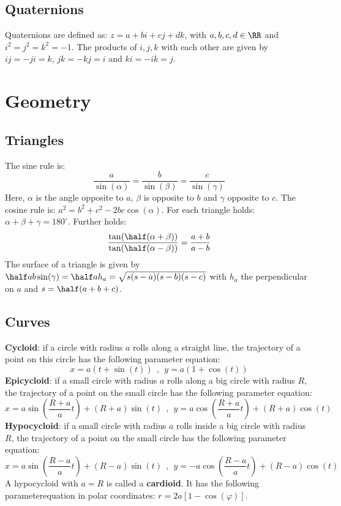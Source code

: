\subsection{Quaternions}
Quaternions are defined as: $z=a+bi+cj+dk$, with $a,b,c,d\in\RR$ and
$i^2=j^2=k^2=-1$. The products of $i,j,k$ with each other are given by
$ij=-ji=k$, $jk=-kj=i$ and $ki=-ik=j$.

\section{Geometry}
\subsection{Triangles}
The sine rule is:
\[
\frac{a}{\sin(\alpha)}=\frac{b}{\sin(\beta)}=\frac{c}{\sin(\gamma)}
\]
Here, $\alpha$ is the angle opposite to $a$, $\beta$ is opposite to $b$ and
$\gamma$ opposite to $c$. The cosine rule is: $a^2=b^2+c^2-2bc\cos(\alpha)$.
For each triangle holds: $\alpha+\beta+\gamma=180^\circ$.
\npar
Further holds:
\[
\frac{\tan(\half(\alpha+\beta))}{\tan(\half(\alpha-\beta))}=\frac{a+b}{a-b}
\]
The surface of a triangle is given by $\half ab\sin(\gamma)=\half ah_a=\sqrt{s(s-a)(s-b)(s-c)}$
with $h_a$ the perpendicular on $a$ and $s=\half(a+b+c)$.

\subsection{Curves}
{\bf Cycloid}: if a circle with radius $a$ rolls along a straight line, the
trajectory of a point on this circle has the following parameter equation:
\[
x=a(t+\sin(t))~~,~~y=a(1+\cos(t))
\]
{\bf Epicycloid}: if a small circle with radius $a$ rolls along a big circle
with radius $R$, the trajectory of a point on the small circle has the
following parameter equation:
\[
x=a\sin\left(\frac{R+a}{a}t\right)+(R+a)\sin(t)~~,~~
y=a\cos\left(\frac{R+a}{a}t\right)+(R+a)\cos(t)
\]
{\bf Hypocycloid}: if a small circle with radius $a$ rolls inside a big circle
with radius $R$, the trajectory of a point on the small circle has the
following parameter equation:
\[
x=a\sin\left(\frac{R-a}{a}t\right)+(R-a)\sin(t)~~,~~
y=-a\cos\left(\frac{R-a}{a}t\right)+(R-a)\cos(t)
\]
A hypocycloid with $a=R$ is called a {\bf cardioid}. It has the following
parameterequation in polar coordinates: $r=2a[1-\cos(\varphi)]$.

